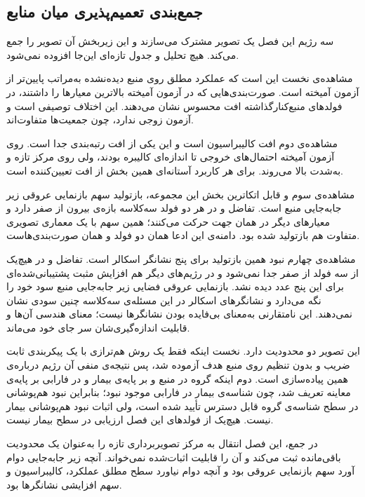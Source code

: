 \subsection{جمع‌بندی تعمیم‌پذیری میان منابع}

سه رژیم این فصل یک تصویر مشترک می‌سازند و این زیربخش آن تصویر را جمع می‌کند. هیچ تحلیل و جدول تازه‌ای این‌جا افزوده نمی‌شود.

مشاهده‌ی نخست این است که عملکرد مطلق روی منبع دیده‌نشده به‌مراتب پایین‌تر از آزمون آمیخته است. صورت‌بندی‌هایی که در آزمون آمیخته بالاترین معیارها را داشتند، در فولدهای منبع‌کنارگذاشته افت محسوس نشان می‌دهند. این اختلاف توصیفی است و آزمون زوجی ندارد، چون جمعیت‌ها متفاوت‌اند.

مشاهده‌ی دوم افت کالیبراسیون است و این یکی از افت رتبه‌بندی جدا است. روی آزمون آمیخته احتمال‌های خروجی تا اندازه‌ای کالیبره بودند، ولی روی مرکز تازه  و  به‌شدت بالا می‌روند. برای هر کاربرد آستانه‌ای همین بخش از افت تعیین‌کننده است.

مشاهده‌ی سوم و قابل اتکاترین بخش این مجموعه، بازتولید سهم بازنمایی عروقی زیر جابه‌جایی منبع است. تفاضل  و  در هر دو فولد سه‌کلاسه بازه‌ی بیرون از صفر دارد و معیارهای دیگر در همان جهت حرکت می‌کنند؛ همین سهم با یک معماری تصویری متفاوت هم بازتولید شده بود. دامنه‌ی این ادعا همان دو فولد و همان صورت‌بندی‌هاست.

مشاهده‌ی چهارم نبود همین بازتولید برای پنج نشانگر اسکالر است. تفاضل  و  در هیچ‌یک از سه فولد از صفر جدا نمی‌شود و در رژیم‌های دیگر هم افزایش مثبت پشتیبانی‌شده‌ای برای این پنج عدد دیده نشد. بازنمایی عروقی فضایی زیر جابه‌جایی منبع سود خود را نگه می‌دارد و نشانگرهای اسکالر در این مسئله‌ی سه‌کلاسه چنین سودی نشان نمی‌دهند. این نامتقارنی به‌معنای بی‌فایده بودن نشانگرها نیست؛ معنای هندسی آن‌ها و قابلیت اندازه‌گیری‌شان سر جای خود می‌ماند.

این تصویر دو محدودیت دارد. نخست اینکه فقط یک روش هم‌ترازی با یک پیکربندی ثابت ضریب و بدون تنظیم روی منبع هدف آزموده شد، پس نتیجه‌ی منفی آن رژیم درباره‌ی همین پیاده‌سازی است. دوم اینکه گروه در منبع  و  بر پایه‌ی بیمار و در فارابی بر پایه‌ی معاینه تعریف شد، چون شناسه‌ی بیمار در فارابی موجود نبود؛ بنابراین نبود هم‌پوشانی در سطح شناسه‌ی گروه قابل دسترس تأیید شده است، ولی اثبات نبود هم‌پوشانی بیمار نیست. هیچ‌یک از فولدهای این فصل ارزیابی در سطح بیمار نیست.

در جمع، این فصل انتقال به مرکز تصویربرداری تازه را به‌عنوان یک محدودیت باقی‌مانده ثبت می‌کند و آن را قابلیت اثبات‌شده نمی‌خواند. آنچه زیر جابه‌جایی دوام آورد سهم بازنمایی عروقی بود و آنچه دوام نیاورد سطح مطلق عملکرد، کالیبراسیون و سهم افزایشی نشانگرها بود.
